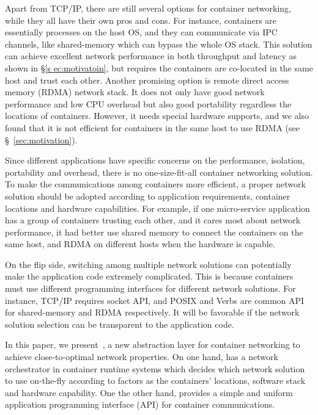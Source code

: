 Apart from TCP/IP, there are still several options for container networking,
while they all have their own pros and cons.
For instance, containers are essentially processes on the host OS, and they can 
communicate via IPC channels, like shared-memory which can bypass the whole OS 
stack. This solution can achieve
excellent network performance in both throughput and latency as shown in \S\ref{s
ec:motivatoin}, but requires the containers are co-located in the same host and 
trust each other. Another promising option is remote direct access memory (RDMA) network stack. It does not only have good network performance and low CPU overhead but also good portability regardless the locations of containers. 
However, it needs special hardware supports, and we also found that it is not efficient for containers in the same host to use RDMA
(see \S~\ref{sec:motivation}). 

Since different applications have specific concerns on the performance, 
isolation, portability and overhead, there is no
one-size-fit-all container networking solution. To make the communications among
containers more efficient, a proper network solution should be adopted according
to application requirements, container locations and hardware capabilities.
For example, if one micro-service application has a group of containers trusting each other, and it cares most about network performance, it had better use
shared memory to connect the containers on the same host, and RDMA on different hosts when the hardware is capable. 

On the flip side, switching among multiple network solutions can potentially 
make the application code extremely complicated. This is because
containers must use different programming interfaces for different
network solutions. For instance, TCP/IP requires socket API, and POSIX and Verbs
are common API for shared-memory and RDMA respectively. 
It will be favorable if the network solution selection can be transparent to the application code.

In this paper, we present~\sysname, a new abstraction layer for container networking to achieve close-to-optimal network properties. 
On one hand, \sysname has a network orchestrator in container runtime systems which decides which network solution to use on-the-fly according to factors as the containers' locations, software stack and hardware capability. One the other hand, \sysname provides a simple and uniform application programming interface (API) for container communications.   

